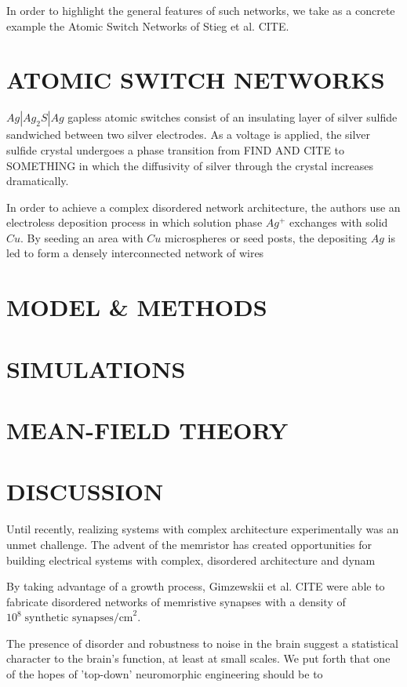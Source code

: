 \documentclass[aps,prl,preprint,groupedaddress]{revtex4-1}
\begin{document}
In order to highlight the general features of such networks, we take as
a concrete example the Atomic Switch Networks of Stieg et al. CITE.


\section{ATOMIC SWITCH NETWORKS}

$Ag | Ag_2 S | Ag$ gapless atomic switches consist of an insulating layer
of silver sulfide sandwiched between two silver electrodes.  As a voltage is
applied, the silver sulfide crystal undergoes a phase transition from FIND AND
CITE to SOMETHING in which the diffusivity of silver through the crystal
increases dramatically.  

In order to achieve a complex disordered network architecture, the
authors use an electroless deposition process in which solution phase
$Ag^+$ exchanges with solid $Cu$.  By seeding an area with $Cu$ 
microspheres or seed posts, the depositing $Ag$ is led to form a
densely interconnected network of wires

\section{MODEL \& METHODS}


\section{SIMULATIONS}


\section{MEAN-FIELD THEORY}


\section{DISCUSSION}


Until recently, realizing systems with complex architecture
experimentally was an unmet challenge.  The advent of the memristor has
created opportunities for building electrical systems with complex, disordered
architecture and dynam

By taking advantage of a growth process, Gimzewskii et
al. CITE were able to fabricate disordered networks of memristive synapses
with a density of $10^8\; \text{synthetic synapses/cm}^2$.

The presence of disorder and robustness to noise in the brain
suggest a statistical character to the brain's function, at least at small
scales.  We put forth that one of the hopes of 'top-down' neuromorphic
engineering should be to 
\end{document}
